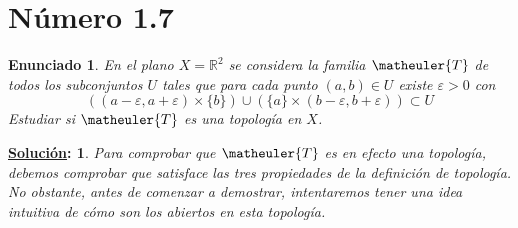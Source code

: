 \documentclass[10pt,a4paper,openright]{book}
\theoremstyle{break}
\newtheorem*{enun}{Enunciado}
\newtheorem*{ej}{\underline{Solución}:}
\begin{document}
\section{Número 1.7}
\begin{enun}
En el plano $X = \mathbb{R}^2$ se considera la familia $\matheuler{T}$ de todos los subconjuntos $U$ tales que para cada punto $(a,b) \in U$ existe $\varepsilon > 0$ con 
$$((a - \varepsilon, a + \varepsilon) \times \{b\}) \cup (\{a\} \times (b-\varepsilon, b + \varepsilon)) \subset U$$
Estudiar si $\matheuler{T}$  es una topología en $X$.
\end{enun}
\begin{ej}
Para comprobar que $\matheuler{T}$ es en efecto una topología, debemos comprobar que satisface las tres propiedades de la definición de topología. No obstante, antes de comenzar a demostrar, intentaremos tener una idea intuitiva de cómo son los abiertos en esta topología.
\begin{figure}[h]

\begin{tikzpicture}[x=0.75pt,y=0.75pt,yscale=-1,xscale=1]


\end{tikzpicture}
\end{figure}
\end{ej}
\end{document}
